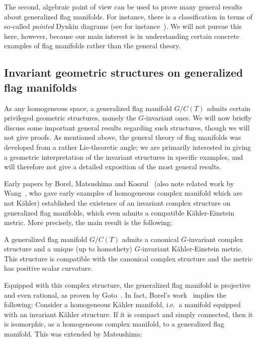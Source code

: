 The second, algebraic point of view can be used to prove many general results about generalized flag manifolds. For instance, there is a classification in terms of so-called \emph{painted} Dynkin diagrams (see for instance~\cite[Ch.~7]{Arv2003}). We will not pursue this here, however, because our main interest is in understanding certain concrete examples of flag manifolds rather than the general theory.

\subsection{Invariant geometric structures on generalized flag manifolds}

As any homogeneous space, a generalized flag manifold $G/C(T)$ admits certain privileged geometric structures, namely the $G$-invariant ones. We will now briefly discuss some important general results regarding such structures, though we will not give proofs. As mentioned above, the general theory of flag manifolds was developed from a rather Lie-theoretic angle; we are primarily interested in giving a geometric interpretation of the invariant structures in specific examples, and will therefore not give a detailed exposition of the most general results.

Early papers by Borel, Matsushima and Koszul~\cite{Bor1954,Kos1955,Mat1957} (also note related work by Wang~\cite{Wan1954}, who gave early examples of homogeneous complex manifold which are not K\"ahler) established the existence of an invariant complex structure on generalized flag manifolds, which even admits a compatible K\"ahler-Einstein metric. More precisely, the main result is the following:

\begin{thm}
	A generalized flag manifold $G/C(T)$ admits a canonical $G$-invariant complex structure and a unique (up to homothety) $G$-invariant K\"ahler-Einstein metric. This structure is compatible with the canonical complex structure and the metric has positive scalar curvature. 
\end{thm}

Equipped with this complex structure, the generalized flag manifold is projective and even rational, as proven by Goto~\cite{Got1954}. In fact, Borel's work~\cite{Bor1954} implies the following: Consider a homogeneous K\"ahler manifold, i.e.~a manifold equipped with an invariant K\"ahler structure. If it is compact and simply connected, then it is isomorphic, as a homogeneous complex manifold, to a generalized flag manifold. This was extended by Matsushima:


